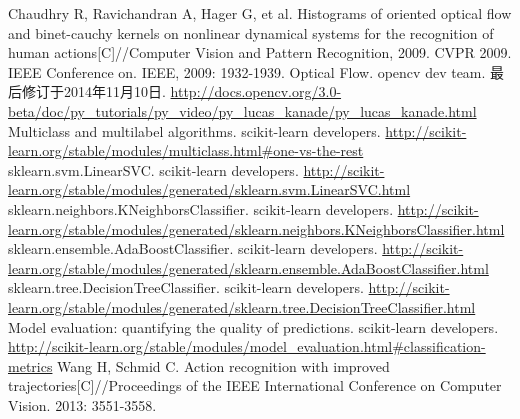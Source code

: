 \documentclass[a4paper, 12pt, UTF8]{article}
\begin{document}
\renewcommand{\refname}{参考}
\begin{thebibliography}{9}
 Chaudhry R, Ravichandran A, Hager G, et al. Histograms of oriented optical flow and binet-cauchy kernels on nonlinear dynamical systems for the recognition of human actions[C]//Computer Vision and Pattern Recognition, 2009. CVPR 2009. IEEE Conference on. IEEE, 2009: 1932-1939.
 Optical Flow. opencv dev team. 最后修订于2014年11月10日.  \url{http://docs.opencv.org/3.0-beta/doc/py_tutorials/py_video/py_lucas_kanade/py_lucas_kanade.html}
 Multiclass and multilabel algorithms. scikit-learn developers. \url{http://scikit-learn.org/stable/modules/multiclass.html#one-vs-the-rest}
 sklearn.svm.LinearSVC. scikit-learn developers. \url{http://scikit-learn.org/stable/modules/generated/sklearn.svm.LinearSVC.html}
 sklearn.neighbors.KNeighborsClassifier. scikit-learn developers. \url{http://scikit-learn.org/stable/modules/generated/sklearn.neighbors.KNeighborsClassifier.html}
 sklearn.ensemble.AdaBoostClassifier. scikit-learn developers. \url{http://scikit-learn.org/stable/modules/generated/sklearn.ensemble.AdaBoostClassifier.html}
 sklearn.tree.DecisionTreeClassifier. scikit-learn developers. \url{http://scikit-learn.org/stable/modules/generated/sklearn.tree.DecisionTreeClassifier.html}
 Model evaluation: quantifying the quality of predictions. scikit-learn developers. \url{http://scikit-learn.org/stable/modules/model_evaluation.html#classification-metrics}
 Wang H, Schmid C. Action recognition with improved trajectories[C]//Proceedings of the IEEE International Conference on Computer Vision. 2013: 3551-3558.
\end{thebibliography}
\end{document}
